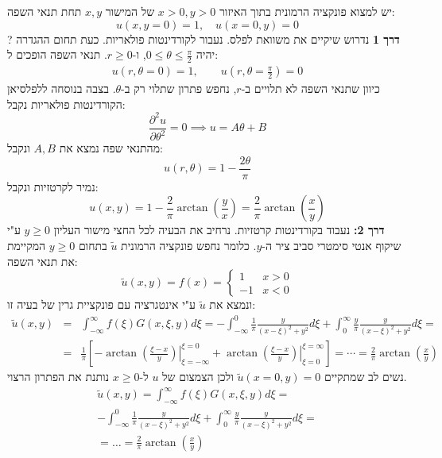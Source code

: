 \documentclass{tstextbook}
\begin{document}
יש למצוא פונקציה הרמונית בתוך האיזור \(x>0,y>0\) של המישור \(x,y\) תחת תנאי השפה:
$$u(x,y=0)=1,\quad u(x=0,y)=0$$
?
\textbf{דרך 1}
נדרוש שיקיים את משוואת לפלס. נעבור לקורדינטות פולאריות. כעת תחום ההגדרה יהיה \(0\leq \theta \leq \frac{\pi}{2}\), ו-\(r\geq 0\). תנאי השפה הופכים ל:
$$ \begin{aligned}u\left(r,\theta=0\right)=1,\quad\quad u\left(r,\theta=\frac{\pi}{2}\right)=0\end{aligned}$$
כיוון שתנאי השפה לא תלויים ב-\(r\), נחפש פתרון שתלוי רק ב-\(\theta\). בצבה בנוסחה ללפלסיאן הקורדינטות פולאריות נקבל:
$$ \frac{\partial^2u}{\partial\theta^2}=0\implies u=A\theta+B$$
מהתנאי שפה נמצא את \(A,B\) ונקבל:
$$u\left(r,\theta\right)=1-\frac{2\theta}{\pi}$$
נמיר לקרטזיות ונקבל:
$$ u\left(x,y\right)=1-\frac2\pi{\arctan\left(\frac yx\right)}=\frac2\pi{\arctan\left(\frac xy\right)}$$\textbf{דרך 2:}
נעבוד בקורדינטות קרטזיות. נרחיב את הבעיה לכל החצי מישור העליון \(y\geq 0\) ע"י שיקוף אנטי סימטרי סביב ציר ה-\(y\). כלומר נחפש פונקציה הרמונית \(\tilde{u}\) בתחום \(y\geq 0\) המקיימת את תנאי השפה:
$$ \tilde{u}\left(x,y\right)=f\left(x\right)=\begin{cases}1&x>0\\-1&x<0\end{cases}$$
ונמצא את \(\tilde{u}\) ע"י אינטגרציה עם פונקציית גרין של בעיה זו:
$$ \begin{array}{rcl}\tilde{u}\left(x,y\right)&=&\displaystyle\int_{-\infty}^{\infty}f\left(\xi\right)G\left(x,\xi,y\right)d\xi=-\int_{-\infty}^{0}\frac{1}{\pi}\frac{y}{\left(x-\xi\right)^{2}+y^{2}}d\xi+\int_{0}^{\infty}\frac{y}{\pi}\frac{y}{\left(x-\xi\right)^{2}+y^{2}}d\xi=\\&=&\displaystyle\frac{1}{\pi}\left[\left.-\arctan\left(\frac{\xi-x}{y}\right)\right|_{\xi=-\infty}^{\xi=0}+\left.\arctan\left(\frac{\xi-x}{y}\right)\right|_{\xi=0}^{\xi=\infty}\right]=\cdots=\frac{2}{\pi}\arctan\left(\frac{x}{y}\right)\end{array}$$
נשים לב שמתקיים \(\tilde{u}(x=0,y)=0\) ולכן הצמצום של \(u\) ל-\(x\geq 0\) נותנת את הפתרון הרצוי.
\begin{gather*}\tilde{u}\left(x,y\right)=\displaystyle\int_{-\infty}^{\infty}f\left(\xi\right)G\left(x,\xi,y\right)d\xi= \\-\int_{-\infty}^{0}\frac{1}{\pi}\frac{y}{\left(x-\xi\right)^{2}+y^{2}}d\xi+\int_{0}^{\infty}\frac{y}{\pi}\frac{y}{\left(x-\xi\right)^{2}+y^{2}}d\xi= \\=\dots=\frac{2}{\pi}\arctan\left(\frac{x}{y}\right)
\end{gather*}
\end{document}
